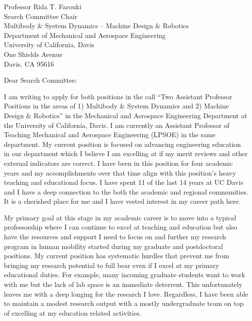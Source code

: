 \documentclass{letter}
\date{}
\begin{document}
\begin{letter}{
  Professor Rida T. Farouki \\
  Search Committee Chair \\
  Multibody \& System Dynamics -- Machine Design \& Robotics \\
  Department of Mechanical and Aerospace Engineering \\
  University of California, Davis \\
  One Shields Avenue \\
  Davis, CA 95616
}

\opening{Dear Search Committee:}

I am writing to apply for both positions in the call ``Two Assistant Professor
Positions in the areas of 1) Multibody \& System Dynamics and 2) Machine Design
\& Robotics'' in the Mechanical and Aerospace Engineering Department at the
University of California, Davis. I am currently an Assistant Professor of
Teaching Mechanical and Aerospace Engineering (LPSOE) in the same department.
My current position is focused on advancing engineering education in our
department which I believe I am excelling at if my merit reviews and other
external indicators are correct. I have been in this position for four academic
years and my accomplishments over that time align with this position's heavy
teaching and educational focus. I have spent 11 of the last 14 years at UC
Davis and I have a deep connection to the both the academic and regional
communities. It is a cherished place for me and I have vested interest in my
career path here.

My primary goal at this stage in my academic career is to move into a typical
professorship where I can continue to excel at teaching and education but also
have the resources and support I need to focus on and further my research
program in human mobility started during my graduate and postdoctoral
positions. My current position has systematic hurdles that prevent me from
bringing my research potential to full bear even if I excel at my primary
educational duties. For example, many incoming graduate students want to work
with me but the lack of lab space is an immediate deterrent. This unfortunately
leaves me with a deep longing for the research I love. Regardless, I have been
able to maintain a modest research output with a mostly undergraduate team on
top of excelling at my education related activities.


\end{letter}
\end{document}
